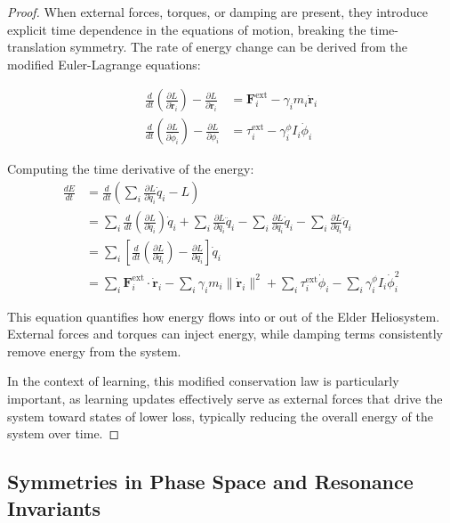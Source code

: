 \begin{proof}
When external forces, torques, or damping are present, they introduce explicit time dependence in the equations of motion, breaking the time-translation symmetry. The rate of energy change can be derived from the modified Euler-Lagrange equations:

\begin{align}
\frac{d}{dt}\left(\frac{\partial L}{\partial \dot{\mathbf{r}}_i}\right) - \frac{\partial L}{\partial \mathbf{r}_i} &= \mathbf{F}_i^{\text{ext}} - \gamma_i m_i \dot{\mathbf{r}}_i \\
\frac{d}{dt}\left(\frac{\partial L}{\partial \dot{\phi}_i}\right) - \frac{\partial L}{\partial \phi_i} &= \tau_i^{\text{ext}} - \gamma_i^{\phi} I_i \dot{\phi}_i
\end{align}

Computing the time derivative of the energy:
\begin{align}
\frac{dE}{dt} &= \frac{d}{dt}\left( \sum_i \frac{\partial L}{\partial \dot{q}_i} \dot{q}_i - L \right) \\
&= \sum_i \frac{d}{dt}\left(\frac{\partial L}{\partial \dot{q}_i}\right) \dot{q}_i + \sum_i \frac{\partial L}{\partial \dot{q}_i} \ddot{q}_i - \sum_i \frac{\partial L}{\partial q_i} \dot{q}_i - \sum_i \frac{\partial L}{\partial \dot{q}_i} \ddot{q}_i \\
&= \sum_i \left[ \frac{d}{dt}\left(\frac{\partial L}{\partial \dot{q}_i}\right) - \frac{\partial L}{\partial q_i} \right] \dot{q}_i \\
&= \sum_i \mathbf{F}_i^{\text{ext}} \cdot \dot{\mathbf{r}}_i - \sum_i \gamma_i m_i \|\dot{\mathbf{r}}_i\|^2 + \sum_i \tau_i^{\text{ext}} \dot{\phi}_i - \sum_i \gamma_i^{\phi} I_i \dot{\phi}_i^2
\end{align}

This equation quantifies how energy flows into or out of the Elder Heliosystem. External forces and torques can inject energy, while damping terms consistently remove energy from the system.

In the context of learning, this modified conservation law is particularly important, as learning updates effectively serve as external forces that drive the system toward states of lower loss, typically reducing the overall energy of the system over time.
\end{proof}

\subsection{Symmetries in Phase Space and Resonance Invariants}

